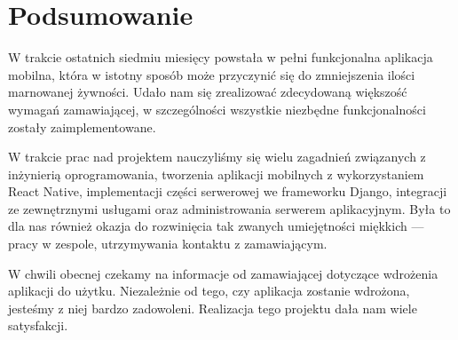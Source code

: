 \documentclass[licencjacka]{pracamgr}
\begin{document}
\chapter{Podsumowanie}\label{r:pods}
W trakcie ostatnich siedmiu miesięcy powstała w pełni funkcjonalna aplikacja mobilna, która w istotny sposób może przyczynić się do zmniejszenia ilości marnowanej żywności. Udało nam się zrealizować zdecydowaną większość wymagań zamawiającej, w szczególności wszystkie niezbędne funkcjonalności zostały zaimplementowane.

W trakcie prac nad projektem nauczyliśmy się wielu zagadnień związanych z inżynierią oprogramowania, tworzenia aplikacji mobilnych z wykorzystaniem React Native, implementacji części serwerowej we frameworku Django, integracji ze zewnętrznymi usługami oraz administrowania serwerem aplikacyjnym. Była to dla nas również okazja do rozwinięcia tak zwanych umiejętności miękkich --- pracy w zespole, utrzymywania kontaktu z zamawiającym.

W chwili obecnej czekamy na informacje od zamawiającej dotyczące wdrożenia aplikacji do użytku. Niezależnie od tego, czy aplikacja zostanie wdrożona, jesteśmy z niej bardzo zadowoleni. Realizacja tego projektu dała nam wiele satysfakcji.
\end{document}
